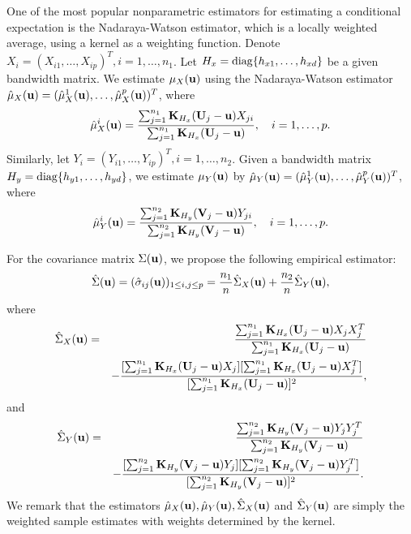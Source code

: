 \documentclass[11pt]{article}
\theoremstyle{definition}
\begin{document}
 One of the most popular nonparametric estimators for estimating a conditional expectation is the Nadaraya-Watson estimator, which is a locally weighted average, using a kernel as a weighting function.  Denote $X_i=(X_{i1},\ldots,X_{ip})^T, i=1,\ldots,n_1$. Let $H_x={\rm diag}\{h_{x1},\ldots, h_{xd}\}$ be a given bandwidth matrix. We estimate $\mu_X({\bf u})$ using the Nadaraya-Watson estimator \citep{Nadaraya} $\hat{\mu}_X({\bf u})=(\hat{\mu}^1_X({\bf u}),\ldots,\hat{\mu}^p_X({\bf u}))^T$, where%
 \begin{eqnarray}\label{muhatx}
 	\hat{\mu}^{i}_X({\bf u})=\frac{\sum_{j=1}^{n_1}{\bf K}_{H_x}({\bf U}_j-{\bf u})X_{ji}}{\sum_{j=1}^{n_1}{\bf K}_{H_x}({\bf U}_j-{\bf u})}, ~~~i=1,\ldots,p.
 \end{eqnarray}
 Similarly,  let $Y_i=(Y_{i1},\ldots,Y_{ip})^T, i=1,\ldots, n_2$. Given a  bandwidth matrix $H_y={\rm diag}\{h_{y1},\ldots, h_{yd}\}$,
 we estimate $\mu_Y({\bf u})$ by $\hat{\mu}_Y({\bf u})=(\hat{\mu}^1_Y({\bf u}),\ldots,\hat{\mu}^p_Y({\bf u}))^T$, where
 \begin{eqnarray}\label{muhaty}
 	\hat{\mu}^{i}_Y({\bf u})=\frac{\sum_{j=1}^{n_2}{\bf K}_{H_y}({\bf V}_j-{\bf u})Y_{ji}}{\sum_{j=1}^{n_2}{\bf K}_{H_y}({\bf V}_j-{\bf u})}, ~~~i=1,\ldots,p.
 \end{eqnarray}
 
 
 For the covariance matrix $\Sigma({\bf u})$, we propose the following empirical estimator:
 \begin{eqnarray}\label{sigmahat}
 	\hat{\Sigma}({\bf u})=(\hat{\sigma}_{ij}({\bf u}))_{1\leq i,j\leq p}=\frac{n_1}{n}\hat{\Sigma}_X({\bf u})+\frac{n_2}{n}\hat{\Sigma}_Y({\bf u}),
 \end{eqnarray}
 where
 \begin{eqnarray}\label{sigmahatx}
 	\hat{\Sigma}_X({\bf u})&=& \frac{\sum_{j=1}^{n_1}{\bf K}_{H_x}({\bf U}_j-{\bf u})X_{j}X_j^T}{\sum_{j=1}^{n_1}{\bf K}_{H_x}({\bf U}_j-{\bf u})}\\
 	&&-\frac{[\sum_{j=1}^{n_1}{\bf K}_{H_x}({\bf U}_j-{\bf u})X_{j}][\sum_{j=1}^{n_1}{\bf K}_{H_x}({\bf U}_j-{\bf u})X_{j}^T]}{[\sum_{j=1}^{n_1}{\bf K}_{H_x}({\bf U}_j-{\bf u})]^2}, \nonumber
 \end{eqnarray}
 and
 \begin{eqnarray}\label{sigmahaty}
 	\hat{\Sigma}_Y({\bf u})&=&\frac{\sum_{j=1}^{n_2}{\bf K}_{H_y}({\bf V}_j-{\bf u})Y_{j}Y_j^T}{\sum_{j=1}^{n_2}{\bf K}_{H_y}({\bf V}_j-{\bf u})}\\
 	&&-\frac{[\sum_{j=1}^{n_2}{\bf K}_{H_y}({\bf V}_j-{\bf u})Y_{j}][\sum_{j=1}^{n_2}{\bf K}_{H_y}({\bf V}_j-{\bf u})Y_{j}^T]}{[\sum_{j=1}^{n_2}{\bf K}_{H_y}({\bf V}_j-{\bf u})]^2}. \nonumber
 \end{eqnarray}
 We remark that the estimators $\hat{\mu}_X({\bf u}), \hat{\mu}_Y({\bf u}),
 \hat{\Sigma}_X({\bf u})$ and $\hat{\Sigma}_Y({\bf u})$ are simply the weighted sample estimates
 with weights determined by the kernel.
 
\end{document}

